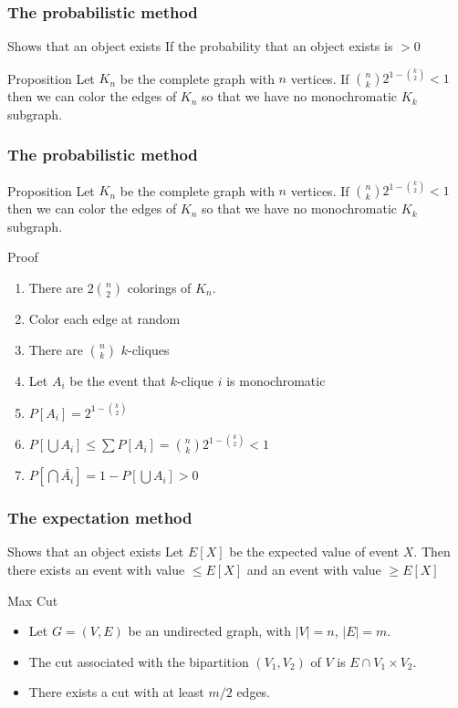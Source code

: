 \documentclass[12pt,aspectratio=169]{beamer}
\begin{document}
\begin{frame}[fragile]
\frametitle{The probabilistic method}
\begin{block}{Shows that an object exists}
  If the probability that an object exists is $>0$
\end{block}

\begin{block}{Proposition}
  Let $K_{n}$ be the complete graph with $n$ vertices.
%
If ${n \choose k} 2^{1- {k \choose 2}} <1$ then we can color the edges of $K_{n}$ so that we
have no monochromatic $K_{k}$ subgraph.
%
\end{block}
\end{frame}

\begin{frame}[fragile]
\frametitle{The probabilistic method}
\begin{block}{Proposition}
  Let $K_{n}$ be the complete graph with $n$ vertices.
%
If ${n \choose k} 2^{1- {k \choose 2}} <1$ then we can color the edges of $K_{n}$ so that we
have no monochromatic $K_{k}$ subgraph.
%
\end{block}

\begin{block}{Proof}
  \begin{enumerate}
  \item
    There are $2{n \choose 2}$ colorings of $K_{n}$.
\item
  Color each edge at random
  \item There are $n \choose k$ $k$-cliques
  \item
    Let $A_{i}$ be the event that $k$-clique $i$ is monochromatic
  \item
    $P[A_{i}] = 2^{1- {k \choose 2}}$
  \item
    $P[\bigcup A_{i}] \le \sum P[A_{i}] = {n \choose k} 2^{1- {k \choose 2}} < 1$
  \item
    $P[\bigcap \bar{A_{i}}] = 1 - P[\bigcup A_{i}] > 0$
  \end{enumerate}
\end{block}
\end{frame}

\begin{frame}[fragile]
\frametitle{The expectation method}
\begin{block}{Shows that an object exists}
  Let $E[X]$ be the expected value of event $X$.
  Then there exists an event with value $\le E[X]$ and an event with value $\ge E[X]$
\end{block}
\begin{block}{Max Cut}
  \begin{itemize}
    \item
  Let $G=(V,E)$ be an undirected graph, with $|V|=n$, $|E|=m$.
%
    \item
  The \alert{cut} associated with the bipartition $(V_{1},V_{2})$ of $V$ is $E\cap
  V_{1}\times V_{2}$.
%
    \item
  There exists a cut with at least $m/2$ edges.
%
\end{itemize}
\end{block}
\end{frame}
\end{document}
